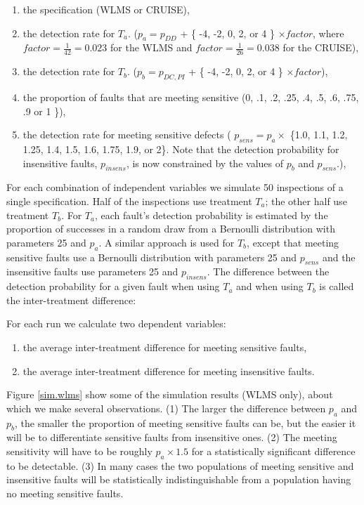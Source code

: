 \begin{enumerate}

\item the specification (WLMS or CRUISE),

\item the detection rate for $T_a$. ($p_a = p_{DD}$ + \{ -4, -2, 0, 2, or 4 \}
$\times factor$, where $factor = \frac{1}{42} = 0.023 $ for the WLMS and 
$factor = \frac{1}{26} = 0.038$ for the CRUISE),

\item the detection rate for $T_b$. ($p_b = p_{DC,PI}$ + \{ -4, -2, 0, 2, or 4 \} 
$\times factor$), 

\item the proportion of faults that are meeting sensitive (0, .1, .2, .25, .4,
.5, .6, .75, .9 or 1 \}),

\item the detection rate for meeting sensitive defects ( $p_{sens} = p_a 
\times $ \{1.0, 1.1, 1.2, 1.25, 1.4, 1.5, 1.6, 1.75, 1.9, or 2\}. Note that 
the detection
probability for insensitive faults, $p_{insens}$, is now constrained by the 
values of $p_b$ and $p_{sens}$.),

\end{enumerate}

For each combination of independent variables we simulate 50 inspections of 
a single specification. Half of the inspections use treatment $T_a$; 
the other half use treatment $T_b$. 
For $T_a$, each fault's detection probability is estimated by 
the proportion of successes in a random draw from a Bernoulli 
distribution with parameters 25 and $p_a$. A similar approach is 
used for $T_b$, except that meeting sensitive faults 
use a Bernoulli distribution with parameters 25 and $p_{sens}$
and the insensitive faults use parameters  25 and $p_{insens}$.
The difference between the detection probability for a given fault
when using $T_a$ and when using $T_b$ is called the inter-treatment 
difference:

For each run we calculate two dependent variables:

\begin{enumerate}

\item the average inter-treatment difference for meeting sensitive faults, 
\item the average inter-treatment difference for meeting insensitive faults.

\end{enumerate}


Figure \ref{sim.wlms} 
show some of the simulation results (WLMS only), 
about which we make several observations. 
(1) The larger the difference between $p_a$ and $p_b$,
the smaller the proportion of meeting sensitive faults can be,
but the easier it will be to differentiate sensitive faults from 
insensitive ones. 
(2) The meeting sensitivity will have to be roughly 
$p_a \times 1.5$ for a statistically significant difference
to be detectable.
(3) In many cases the two populations of meeting sensitive and insensitive 
faults will be statistically
indistinguishable from a population having no meeting sensitive faults. 

